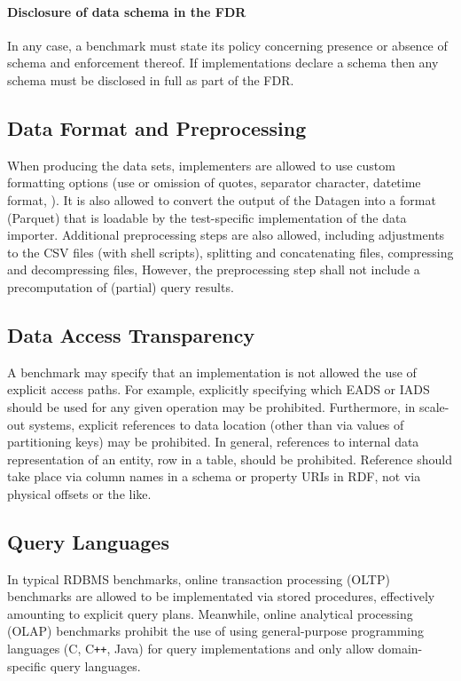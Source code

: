 \paragraph{Disclosure of data schema in the FDR}
In any case, a benchmark must state its policy concerning presence or absence of schema and enforcement thereof. If implementations declare a schema then any schema must be disclosed in full as part of the FDR.

\subsection{Data Format and Preprocessing}
\label{sec:auditing-data-format}

When producing the data sets, implementers are allowed to use custom formatting options (\eg use or omission of quotes, separator character, datetime format, \etc).
It is also allowed to convert the output of the Datagen into a format (\eg Parquet) that is loadable by the test-specific implementation of the data importer.
Additional preprocessing steps are also allowed, including adjustments to the CSV files (\eg with shell scripts), splitting and concatenating files, compressing and decompressing files, \etc
However, the preprocessing step shall not include a precomputation of (partial) query results.

\subsection{Data Access Transparency}

A benchmark may specify that an implementation is not allowed the use of explicit access paths. For example, explicitly specifying which EADS or IADS should be used for any given operation may be prohibited. Furthermore, in scale-out systems, explicit references to data location (other than via values of partitioning keys) may be prohibited. In general, references to internal data representation of an entity, \eg row in a table, should be prohibited. Reference should take place via column names in a schema or property URIs in RDF, not via physical offsets or the like.

\subsection{Query Languages}
\label{sec:query-languages}

In typical RDBMS benchmarks, online transaction processing (OLTP) benchmarks are allowed to be implementated via stored procedures, effectively amounting to explicit query plans.
Meanwhile, online analytical processing (OLAP) benchmarks prohibit the use of using general-purpose programming languages (\eg C, C\texttt{++}, Java) for query implementations and only allow domain-specific query languages.

